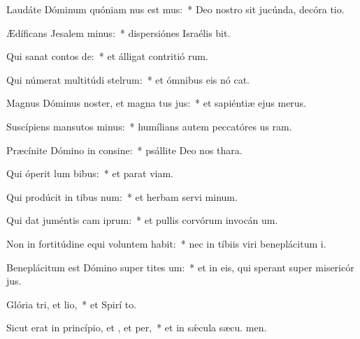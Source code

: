\item Laudáte Dóminum quóniam nus est mus:~* Deo nostro sit jucúnda, decóra tio.
\item Ædíficans Jesalem minus:~* dispersiónes Israélis bit.
\item Qui sanat contos de:~* et álligat contritió rum.
\item Qui númerat multitúdi stelrum:~* et ómnibus eis nó cat.
\item Magnus Dóminus noster, et magna tus jus:~* et sapiéntiæ ejus   merus.
\item Suscípiens mansutos minus:~* humílians autem peccatóres us  ram.
\item Præcínite Dómino in consine:~* psállite Deo nos  thara.
\item Qui óperit lum bibus:~* et parat  viam.
\item Qui prodúcit in tibus num:~* et herbam servi minum.
\item Qui dat juméntis cam iprum:~* et pullis corvórum invocán um.
\item Non in fortitúdine equi voluntem habit:~* nec in tíbiis viri beneplácitum  i.
\item Beneplácitum est Dómino super tites um:~* et in eis, qui sperant super misericór jus.
\item Glória tri, et lio,~* et Spirí to.
\item Sicut erat in princípio, et , et per,~* et in sǽcula sæcu. men.
